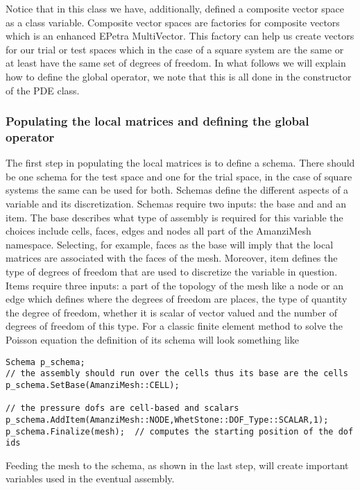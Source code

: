 Notice that in this class we have, additionally, defined a composite vector space as a class variable. 
Composite vector spaces are factories for composite vectors which is an enhanced EPetra MultiVector. 
This factory can help us create vectors for our trial or test spaces which in the case of a square system are the same or at least have the same set of degrees of freedom. In what follows we will explain how to define the global operator, we note that this is all done in the constructor of the PDE class.


\subsubsection{Populating the local matrices and defining the global operator}\label{Sec:LocalMatAndGlobalOp}
The first step in populating the local matrices is to define a schema. 
There should be one schema for the test space and one for the trial space, in the case of square systems the same can be used for both. 
Schemas define the different aspects of a variable and its discretization. Schemas require two inputs: the base and and an item. The base describes what type of assembly is required for this variable the choices include cells, faces, edges and nodes all part of the AmanziMesh namespace. Selecting, for example, faces as the base will imply that the local matrices are associated with the faces of the mesh. Moreover, item defines the type of degrees of freedom that are used to discretize the variable in question. Items require three inputs: a part of the topology of the mesh like a node or an edge which defines where the degrees of freedom are places, the type of quantity the degree of freedom, whether it is scalar of vector valued and the number of degrees of freedom of this type. For a classic finite element method to solve the Poisson equation the definition of its schema will look something like
%
\begin{lstlisting}
Schema p_schema;
// the assembly should run over the cells thus its base are the cells
p_schema.SetBase(AmanziMesh::CELL);

// the pressure dofs are cell-based and scalars
p_schema.AddItem(AmanziMesh::NODE,WhetStone::DOF_Type::SCALAR,1);
p_schema.Finalize(mesh);  // computes the starting position of the dof ids
\end{lstlisting}
%
Feeding the mesh to the schema, as shown in the last step, will create important variables used in the eventual assembly.

